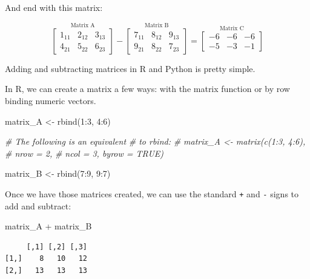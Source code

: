 \documentclass[
  letterpaper,
]{krantz}
\newenvironment{Shaded}{}{}
\newcommand{\CommentTok}[1]{\textcolor[rgb]{0.38,0.63,0.69}{\textit{#1}}}
\newcommand{\DecValTok}[1]{\textcolor[rgb]{0.25,0.63,0.44}{#1}}
\newcommand{\FunctionTok}[1]{\textcolor[rgb]{0.02,0.16,0.49}{#1}}
\newcommand{\NormalTok}[1]{#1}
\newcommand{\OtherTok}[1]{\textcolor[rgb]{0.00,0.44,0.13}{#1}}
\newcommand{\SpecialCharTok}[1]{\textcolor[rgb]{0.25,0.44,0.63}{#1}}
\begin{document}
And end with this matrix:

\[
\stackrel{\mbox{Matrix A}}{
\begin{bmatrix}
1_{11} & 2_{12} & 3_{13}\\
4_{21} & 5_{22} & 6_{23}
\end{bmatrix}
}
-
\stackrel{\mbox{Matrix B}}{
\begin{bmatrix}
7_{11} & 8_{12} & 9_{13}\\
9_{21} & 8_{22} & 7_{23}
\end{bmatrix} 
}
=
\stackrel{\mbox{Matrix C}}{
\begin{bmatrix}
-6 & -6 & -6 \\
-5 & -3 & -1
\end{bmatrix}
}
\]

Adding and subtracting matrices in R and Python is pretty simple.

In R, we can create a matrix a few ways: with the matrix function or by
row binding numeric vectors.

\begin{Shaded}
\begin{Highlighting}[]
\NormalTok{matrix\_A }\OtherTok{\textless{}{-}} \FunctionTok{rbind}\NormalTok{(}\DecValTok{1}\SpecialCharTok{:}\DecValTok{3}\NormalTok{, }
                  \DecValTok{4}\SpecialCharTok{:}\DecValTok{6}\NormalTok{)}

\CommentTok{\# The following is an equivalent}
\CommentTok{\# to rbind:}
\CommentTok{\# matrix\_A \textless{}{-} matrix(c(1:3, 4:6), }
\CommentTok{\#                    nrow = 2, }
\CommentTok{\#                    ncol = 3, byrow = TRUE)}

\NormalTok{matrix\_B }\OtherTok{\textless{}{-}} \FunctionTok{rbind}\NormalTok{(}\DecValTok{7}\SpecialCharTok{:}\DecValTok{9}\NormalTok{, }
                  \DecValTok{9}\SpecialCharTok{:}\DecValTok{7}\NormalTok{)}
\end{Highlighting}
\end{Shaded}

Once we have those matrices created, we can use the standard \texttt{+}
and \texttt{-} signs to add and subtract:

\begin{Shaded}
\begin{Highlighting}[]
\NormalTok{matrix\_A }\SpecialCharTok{+}\NormalTok{ matrix\_B}
\end{Highlighting}
\end{Shaded}

\begin{verbatim}
     [,1] [,2] [,3]
[1,]    8   10   12
[2,]   13   13   13
\end{verbatim}
\end{document}
